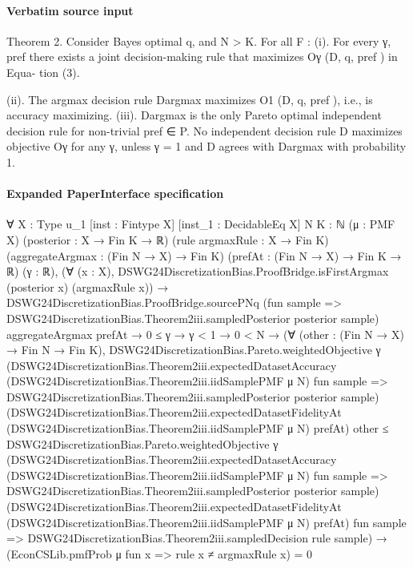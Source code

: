 \documentclass[10pt]{article}
\begin{document}
\paragraph{Verbatim source input}
\begin{ReviewVerbatim}
Theorem 2. Consider Bayes optimal q, and N > K. For all F :
   (i). For every γ, pref there exists a joint decision-making rule that maximizes Oγ (D, q, pref ) in Equa-
        tion (3).

  (ii). The argmax decision rule Dargmax maximizes O1 (D, q, pref ), i.e., is accuracy maximizing.
 (iii). Dargmax is the only Pareto optimal independent decision rule for non-trivial pref ∈ P. No independent
        decision rule D maximizes objective Oγ for any γ, unless γ = 1 and D agrees with Dargmax with
        probability 1.
\end{ReviewVerbatim}


\paragraph{Expanded PaperInterface specification}
\begin{ReviewVerbatim}
∀ {X : Type u_1} [inst : Fintype X] [inst_1 : DecidableEq X] {N K : ℕ} (μ : PMF X) (posterior : X → Fin K → ℝ)
  (rule argmaxRule : X → Fin K) (aggregateArgmax : (Fin N → X) → Fin K) (prefAt : (Fin N → X) → Fin K → ℝ) (γ : ℝ),
  (∀ (x : X), DSWG24DiscretizationBias.ProofBridge.isFirstArgmax (posterior x) (argmaxRule x)) →
    DSWG24DiscretizationBias.ProofBridge.sourcePNq
        (fun sample => DSWG24DiscretizationBias.Theorem2iii.sampledPosterior posterior sample) aggregateArgmax prefAt →
      0 ≤ γ →
        γ < 1 →
          0 < N →
            (∀ (other : (Fin N → X) → Fin N → Fin K),
                DSWG24DiscretizationBias.Pareto.weightedObjective γ
                    (DSWG24DiscretizationBias.Theorem2iii.expectedDatasetAccuracy
                      (DSWG24DiscretizationBias.Theorem2iii.iidSamplePMF μ N) fun sample =>
                      DSWG24DiscretizationBias.Theorem2iii.sampledPosterior posterior sample)
                    (DSWG24DiscretizationBias.Theorem2iii.expectedDatasetFidelityAt
                      (DSWG24DiscretizationBias.Theorem2iii.iidSamplePMF μ N) prefAt)
                    other ≤
                  DSWG24DiscretizationBias.Pareto.weightedObjective γ
                    (DSWG24DiscretizationBias.Theorem2iii.expectedDatasetAccuracy
                      (DSWG24DiscretizationBias.Theorem2iii.iidSamplePMF μ N) fun sample =>
                      DSWG24DiscretizationBias.Theorem2iii.sampledPosterior posterior sample)
                    (DSWG24DiscretizationBias.Theorem2iii.expectedDatasetFidelityAt
                      (DSWG24DiscretizationBias.Theorem2iii.iidSamplePMF μ N) prefAt)
                    fun sample => DSWG24DiscretizationBias.Theorem2iii.sampledDecision rule sample) →
              (EconCSLib.pmfProb μ fun x => rule x ≠ argmaxRule x) = 0
\end{ReviewVerbatim}
\end{document}
